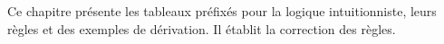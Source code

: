 \documentclass[../../../include/open-logic-chapter]{subfiles}
\begin{document}

Ce chapitre présente les tableaux préfixés pour la logique
intuitionniste, leurs règles et des exemples de dérivation.
Il établit la correction des règles.


\OLEndChapterHook
\end{document}
